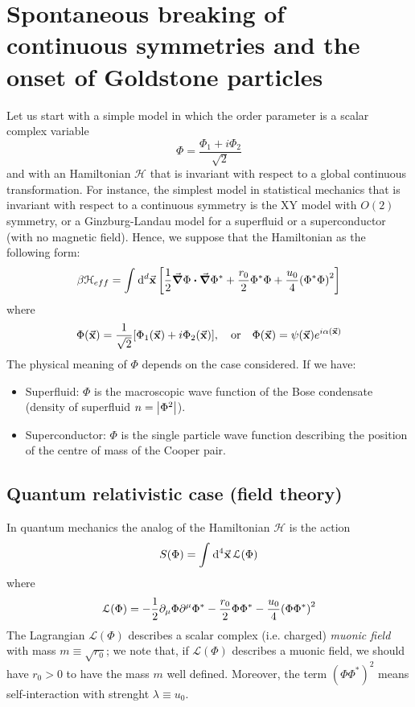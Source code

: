 \documentclass[../main/main.tex]{subfiles}
\begin{document}
\section{Spontaneous breaking of continuous symmetries and the onset of Goldstone particles}
Let us start with a simple model in which the order parameter is a scalar complex variable
\begin{equation*}
  \Phi = \frac{\Phi _1 + i \Phi _2}{\sqrt{2} }
\end{equation*}
and with an Hamiltonian \( \mathcal{H} \) that is invariant with respect to a global continuous transformation. For instance, the simplest model in statistical mechanics that is invariant with respect to a continuous symmetry is the XY model with \( O(2) \) symmetry, or a Ginzburg-Landau model for a superfluid or a superconductor (with no magnetic field). Hence, we suppose that the Hamiltonian as the following form:
\begin{equation*}
  \beta \mathcal{H}_{eff} = \int_{}^{} \dd[d]{\va{x}} \qty[ \frac{1}{2} \va{\grad }\Phi \vdot \va{\grad } \Phi ^* + \frac{r_0}{2} \Phi ^* \Phi + \frac{u_0}{4} \qty(\Phi ^* \Phi )^2 ]
\end{equation*}
where
\begin{equation*}
  \Phi (\va{x}) = \frac{1}{\sqrt{2} } \qty[ \Phi _1 (\va{x}) + i \Phi _2 (\va{x})], \quad \text{or} \quad \Phi (\va{x}) = \psi (\va{x}) e^{i \alpha (\va{x})}
\end{equation*}
The physical meaning of \( \Phi  \) depends on the case considered. If we have:

\begin{itemize}
\item Superfluid: \( \Phi  \) is the macroscopic wave function of the Bose condensate (density of superfluid \( n= \abs{\Phi ^2}  \)).
\item Superconductor: \( \Phi  \) is the single particle wave function describing the position of the centre of mass of the Cooper pair.
\end{itemize}

\subsection{Quantum relativistic case (field theory)}
In quantum mechanics the analog of the Hamiltonian \( \mathcal{H} \) is the action
\begin{equation}
  S(\Phi ) = \int_{}^{} \dd[4]{\va{x}}   \mathcal{L} ( \Phi )
\end{equation}
where
\begin{equation}
  \mathcal{L} (\Phi ) = - \frac{1}{2} \partial_\mu \Phi \partial^\mu \Phi ^*
  - \frac{r_0}{2} \Phi \Phi ^* - \frac{u_0}{4} \qty(\Phi \Phi ^*)^2
  \label{eq:n_8}
\end{equation}
The Lagrangian \( \mathcal{L} (\Phi ) \) describes a scalar complex (i.e. charged) \emph{muonic field} with mass \( m \equiv \sqrt{r_0} \); we note that, if  \( \mathcal{L} (\Phi ) \) describes a muonic field, we should have \( r_0>0 \) to have the mass \( m \) well defined. Moreover, the term \( (\Phi \Phi ^*)^2 \) means self-interaction with strenght \( \lambda \equiv u_0 \).
\end{document}
